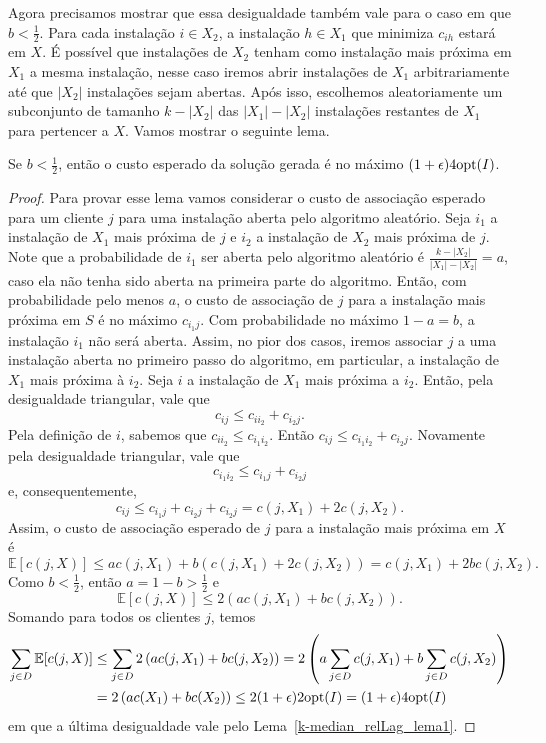 Agora precisamos mostrar que essa desigualdade também vale para o caso em que $ b < \frac{1}{2}$. Para cada instalação $i \in X_2$, a instalação $h \in X_1$ que minimiza $c_{ih}$ estará em $X$. É possível que instalações de $X_2$ tenham como instalação mais próxima em $X_1$ a mesma instalação, nesse caso iremos abrir instalações de $X_1$ arbitrariamente até que $|X_2|$ instalações sejam abertas. Após isso, escolhemos aleatoriamente um subconjunto de tamanho $k - |X_2|$ das $|X_1| - |X_2|$ instalações restantes de $X_1$ para pertencer a $X$. Vamos mostrar o seguinte lema.
\begin{lemma}
    \label{k-median_relLag_lema2}
    Se $b < \frac{1}{2}$, então o custo esperado da solução gerada é no máximo $(1 + \epsilon)4\mathrm{opt}(I)$.
\end{lemma}
\begin{proof}
Para provar esse lema vamos considerar o custo de associação esperado para um cliente $j$ para uma instalação aberta pelo algoritmo aleatório. Seja $i_1$ a instalação de $X_1$ mais próxima de $j$ e $i_2$ a instalação de $X_2$ mais próxima de $j$. Note que a probabilidade de $i_1$ ser aberta pelo algoritmo aleatório é $\frac{k - |X_2|}{|X_1| - |X_2|} = a$, caso ela não tenha sido aberta na primeira parte do algoritmo. Então, com probabilidade pelo menos $a$, o custo de associação de $j$ para a instalação mais próxima em $S$ é no máximo $c_{i_1j}$. Com probabilidade no máximo $1 - a = b$, a instalação $i_1$ não será aberta. Assim, no pior dos casos, iremos associar $j$ a uma instalação aberta no primeiro passo do algoritmo, em particular, a instalação de $X_1$ mais próxima à $i_2$. Seja $i$ a instalação  de $X_1$ mais próxima a $i_2$. Então, pela desigualdade triangular, vale que
\[c_{ij} \leq c_{ii_2} + c_{i_2j}.\]
Pela definição de $i$, sabemos que $c_{ii_2} \leq c_{i_1i_2}$. Então \(c_{ij} \leq c_{i_1i_2} + c_{i_2j}\). Novamente pela desigualdade triangular, vale que 
\[c_{i_1i_2} \leq c_{i_1j} + c_{i_2j}\]
e, consequentemente,
\[c_{ij} \leq c_{i_1j} + c_{i_2j} + c_{i_2j} = c(j,X_1) + 2 c(j,X_2).\]
Assim, o custo de associação esperado de $j$ para a instalação mais próxima em $X$ é
\[\mathbb{E}[c(j,X)] \leq a c\left(j,X_1\right) + b\left(c(j,X_1) + 2 c(j,X_2)\right) = c(j,X_1) + 2bc(j,X_2).\] 
Como $b < \frac{1}{2}$, então $a = 1 - b > \frac{1}{2}$ e 
\[\mathbb{E}[c(j,X)] \leq 2\left( a c(j,X_1) + bc(j,X_2)\right).\]
Somando para todos os clientes $j$, temos
\begin{subequations}
    \begin{align*}
        \sum_{j \in D}\mathbb{E}[c(j,X)] &\leq \sum_{j \in D}2\left( a c(j,X_1) + bc(j,X_2)\right) = 2\left(a \sum_{j\in D} c(j,X_1) + b \sum_{j \in D} c(j,X_2)\right) \\
        & = 2\left( a c(X_1) + b c(X_2)\right) \leq 2 (1 + \epsilon) 2 \mathrm{opt}(I) = (1+\epsilon) 4\mathrm{opt}(I)
    \end{align*}
\end{subequations}
em que a última desigualdade vale pelo Lema~\ref{k-median_relLag_lema1}.
\end{proof}

